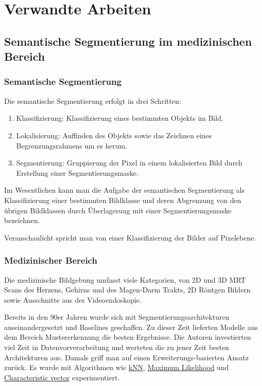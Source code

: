 \newcommand{\source}[1]{\caption*{Source: {#1}} }

\section{Verwandte Arbeiten}\raggedbottom

\subsection{Semantische Segmentierung im medizinischen Bereich}

\subsubsection{Semantische Segmentierung}

Die semantische Segmentierung erfolgt in drei Schritten:

\begin{enumerate}
\item Klassifizierung: Klassifizierung eines bestimmten Objekts im Bild.
\item Lokalisierung: Auffinden des Objekts sowie das Zeichnen eines Begrenzungsrahmens um es herum.
\item Segmentierung: Gruppierung der Pixel in einem lokalisierten Bild durch Erstellung einer Segmentierungsmaske.
\end{enumerate}

Im Wesentlichen kann man die Aufgabe der semantischen Segmentierung als Klassifizierung einer bestimmten Bildklasse und deren Abgrenzung von den übrigen Bildklassen durch Überlagerung mit einer Segmentierungsmaske bezeichnen.

Veranschaulicht spricht man von einer Klassifizierung der Bilder auf Pixelebene.

\subsubsection{Medizinischer Bereich}

Die medizinische Bildgebung umfasst viele Kategorien, von 2D und 3D MRT Scans des Herzens, Gehirns und des Magen-Darm Trakts, 2D Röntgen Bildern sowie Ausschnitte aus der Videoendoskopie.

Bereits in den 90er Jahren wurde sich mit Segmentierungsarchitekturen auseinandergesetzt und Baselines geschaffen. Zu dieser Zeit lieferten Modelle aus dem Bereich Mustererkennung die besten Ergebnisse. Die Autoren investierten viel Zeit in Datenvorverarbeitung und werteten die zu jener Zeit besten Architekturen aus. Damals griff man auf einen Erweiterungs-basierten Ansatz zurück. Es wurde mit Algorithmen wie
\href{https://en.wikipedia.org/wiki/K-nearest_neighbors_algorithm}{kNN},
\href{https://en.wikipedia.org/wiki/Maximum_likelihood_estimation}{Maximum Likelihood} und
\href{https://en.wikipedia.org/wiki/Eigenvalues_and_eigenvectors}{Characteristic vector} experimentiert.

